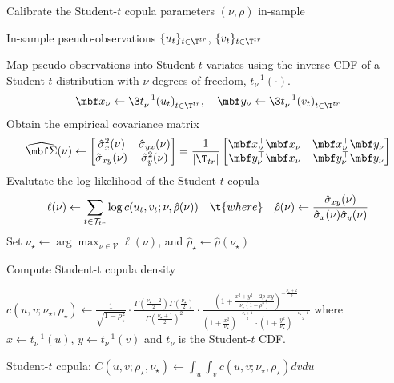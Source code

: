 \begin{algorithm}[H]
\label{alg:calibrating_student-t}
\caption{Calibrate the Student-$t$ copula parameters $(\nu,\rho)$ in-sample}
\begin{algorithmic}[1]
\Require In-sample pseudo-observations $\{u_t\}_{t\in\T^{tr}}$, $\{v_t\}_{t\in\T^{tr}}$ 

\mx 
{}
	\State Map pseudo-observations into Student-$t$ variates using the inverse CDF of a Student-$t$ distribution with $\nu$ degrees of freedom, $t_{\nu}^{-1}(\cdot)$.
$$
\mbf x_{\nu} \gets \3{t_{\nu}^{-1}(u_t)}_{t\in\T^{tr}}
, \quad 
\mbf y_{\nu} \gets \3{t_{\nu}^{-1}(v_t)}_{t\in\T^{tr}}
$$
	\State Obtain the empirical covariance matrix 
		$$
		\widehat{\mbf \Sigma}(\nu)
		\gets
		\begin{bmatrix} 
			\hat \sigma_{x}^2(\nu) & \hat \sigma_{yx}(\nu) \\
			\hat \sigma_{xy}(\nu) & \hat \sigma_{y}^2(\nu)
		\end{bmatrix}
		= 
		\frac{1}{|\T_{tr}|}
		\begin{bmatrix} 
			\mbf x_{\nu}^\top\mbf x_{\nu} & \mbf x_{\nu}^\top\mbf y_{\nu} \\ 
			\mbf y_{\nu}^\top\mbf x_{\nu} & \mbf y_{\nu}^\top\mbf y_{\nu} 
		\end{bmatrix}
		$$
	\State Evalutate the log-likelihood of the Student-$t$ copula
$$
\ell(\nu) \gets
\sum_{t\in\mathcal T_{tr}}  \log c(u_t, v_t; \nu, \hat \rho(\nu))
\quad 
\t{where}
\quad 
\hat \rho(\nu) \gets \frac{\hat \sigma_{xy}(\nu)}{\hat \sigma_x(\nu) \hat \sigma_y(\nu)}
$$
\EndFor
\State Set 
	$\displaystyle \nu_{\star} \gets \arg\max_{\nu \in \mathcal V} \ell(\nu)$, and
	$\displaystyle \hat \rho_\star \gets  \hat \rho (\nu_\star)$

\mx 
\State Compute Student-t copula density

$\displaystyle
c(u,v; \nu_\star, \rho_\star) \gets 
	\frac{1}{\sqrt{1-\rho_\star^2}} \cdot \frac{\Gamma(\frac{\nu_\star+2}{2})\Gamma(\frac{\nu_\star}{2})}{\Gamma(\frac{\nu_\star+1}{2})^2} \cdot \frac{\left(1 + \frac{x^2 + y^2 - 2\rho_\star xy}{\nu_\star(1-\rho^2)}\right)^{-\frac{\nu_\star+2}{2}}}{\left(1 + \frac{x^2}{\nu_\star}\right)^{-\frac{\nu_\star+1}{2}} \cdot \left(1 + \frac{y^2}{\nu_\star}\right)^{-\frac{\nu_\star+1}{2}}}
$
where $x \gets t_\nu^{-1}(u)$, $y \gets t_\nu^{-1}(v)$ and $t_\nu$ is the Student-$t$ CDF.


\bx 
\Ensure Student-$t$ copula: $C(u,v; \rho_\star, \nu_\star)\gets \int_{u}\int_v c(u,v; \nu_\star, \rho_\star) dvdu$
\end{algorithmic}
\end{algorithm}



